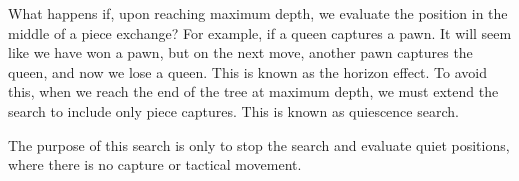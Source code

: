 What happens if, upon reaching maximum depth, we evaluate the position in the middle of a piece exchange? For example, if a queen captures a pawn. It will seem like we have won a pawn, but on the next move, another pawn captures the queen, and now we lose a queen. This is known as the horizon effect. To avoid this, when we reach the end of the tree at maximum depth, we must extend the search to include only piece captures. This is known as quiescence search.

\vspace{1em}

\noindent The purpose of this search is only to stop the search and evaluate quiet positions, where there is no capture or tactical movement.

\vspace{1em}

